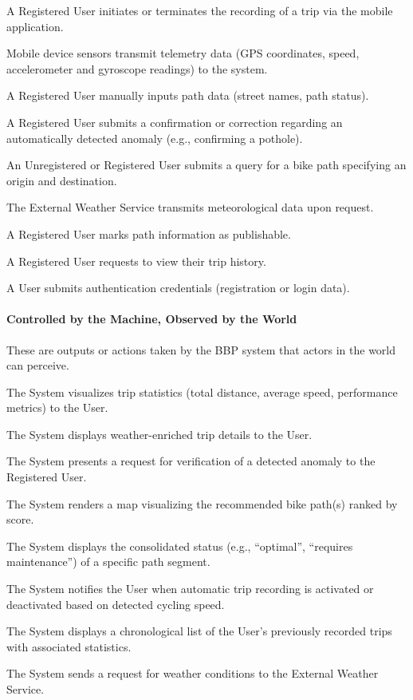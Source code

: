 \begin{enumerate}[label=\textbf{[WM\arabic*]}:]
     \item A Registered User initiates or terminates the recording of a trip via the mobile application.
    \item Mobile device sensors transmit telemetry data (GPS coordinates, speed, accelerometer and gyroscope readings) to the system.
    \item A Registered User manually inputs path data (street names, path status).
    \item A Registered User submits a confirmation or correction regarding an automatically detected anomaly (e.g., confirming a pothole).
    \item An Unregistered or Registered User submits a query for a bike path specifying an origin and destination.
    \item The External Weather Service transmits meteorological data upon request.
    \item A Registered User marks path information as publishable.
    \item A Registered User requests to view their trip history.
    \item A User submits authentication credentials (registration or login data).
\end{enumerate}

\paragraph{Controlled by the Machine, Observed by the World}
These are outputs or actions taken by the BBP system that actors in the world can perceive.

\begin{enumerate}[label=\textbf{[MW\arabic*]}:]
    \item The System visualizes trip statistics (total distance, average speed, performance metrics) to the User.
    \item The System displays weather-enriched trip details to the User.
    \item The System presents a request for verification of a detected anomaly to the Registered User.
    \item The System renders a map visualizing the recommended bike path(s) ranked by score.
    \item The System displays the consolidated status (e.g., ``optimal'', ``requires maintenance'') of a specific path segment.
    \item The System notifies the User when automatic trip recording is activated or deactivated based on detected cycling speed.
    \item The System displays a chronological list of the User's previously recorded trips with associated statistics.
    \item The System sends a request for weather conditions to the External Weather Service.
\end{enumerate}

